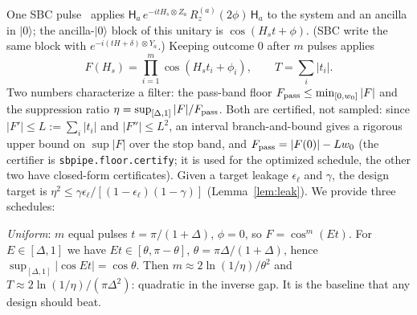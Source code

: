 \documentclass[aps,pra,twocolumn,superscriptaddress,nofootinbib]{revtex4-2}
\newcommand{\ket}[1]{|#1\rangle}
\begin{document}
One SBC pulse~\cite{Stetcu2023} applies $\mathsf H_a\,e^{-itH_s\otimes Z_a}\,R_z^{(a)}(2\phi)\,\mathsf H_a$
to the system and an ancilla in $\ket0$; the ancilla-$\ket0$ block of this unitary is
$\cos(H_st+\phi)$. (SBC write the same block with $e^{-i(tH+\delta)\otimes Y_a}$.) Keeping outcome 0
after $m$ pulses applies
\begin{equation}
F(H_s)=\prod_{i=1}^m\cos(H_st_i+\phi_i),\qquad T=\sum_i|t_i|.
\end{equation}
Two numbers characterize a filter: the pass-band floor $F_{\rm pass}\le\min_{[0,w_0]}|F|$ and the
suppression ratio $\eta=\sup_{[\Delta,1]}|F|/F_{\rm pass}$. Both are certified, not sampled: since
$|F'|\le L:=\sum_i|t_i|$ and $|F''|\le L^2$, an interval branch-and-bound gives a rigorous upper bound
on $\sup|F|$ over the stop band, and $F_{\rm pass}=|F(0)|-Lw_0$ (the certifier is
\texttt{sbpipe.floor.certify}; it is used for the optimized schedule, the other two have
closed-form certificates). Given a target leakage $\epsilon_\ell$ and $\gamma$, the
design target is $\eta^2\le\gamma\epsilon_\ell/[(1-\epsilon_\ell)(1-\gamma)]$ (Lemma~\ref{lem:leak}).
We provide three schedules:

\emph{Uniform}: $m$ equal pulses $t=\pi/(1+\Delta)$, $\phi=0$, so $F=\cos^m(Et)$. For $E\in[\Delta,1]$
we have $Et\in[\theta,\pi-\theta]$, $\theta=\pi\Delta/(1+\Delta)$, hence $\sup_{[\Delta,1]}|\cos Et|=\cos\theta$. Then
$m\approx2\ln(1/\eta)/\theta^2$ and $T\approx2\ln(1/\eta)/(\pi\Delta^2)$: quadratic in the inverse gap.
It is the baseline that any design should beat.
\end{document}
